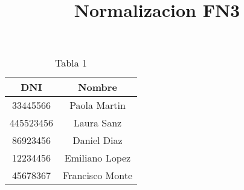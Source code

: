 \documentclass[letterpaper,12pt]{article}
\title{\textbf{Normalizacion FN3}}
\begin{document}
\maketitle

    \begin{table}[h!]
        \begin{center}
        \begin{tabular}{|c|c|}
        \hline
        \textbf{DNI}&\textbf{Nombre}\\
        \hline
            33445566 & Paola Martin\\\hline
            445523456 & Laura Sanz\\\hline
            86923456 & Daniel Diaz\\\hline
            12234456 & Emiliano Lopez\\\hline
            45678367 & Francisco Monte\\
        \hline
        \end{tabular}
        \end{center}
    \caption{Tabla 1}
    \end{table}
    
\end{document}
